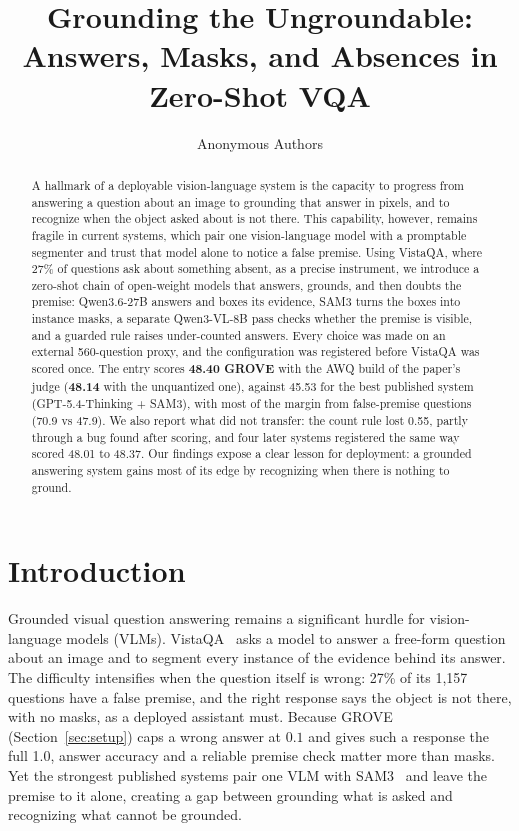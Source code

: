 \documentclass{article}
\title{Grounding the Ungroundable:\\ Answers, Masks, and Absences in Zero-Shot VQA}
\author{Anonymous Authors}
\begin{document}
\maketitle

\begin{abstract}
A hallmark of a deployable vision-language system is the capacity to progress from answering a question about an image to
grounding that answer in pixels, and to recognize when the object asked about is not there. This capability, however,
remains fragile in current systems, which pair one vision-language model with a promptable segmenter and trust that model
alone to notice a false premise. Using VistaQA, where 27\% of questions ask about something absent, as a precise instrument,
we introduce a zero-shot chain of open-weight models that answers, grounds, and then doubts the premise: Qwen3.6-27B answers
and boxes its evidence, SAM3 turns the boxes into instance masks, a separate Qwen3-VL-8B pass checks whether the premise is
visible, and a guarded rule raises under-counted answers. Every choice was made on an external 560-question proxy, and the
configuration was registered before VistaQA was scored once. The entry scores \textbf{48.40 GROVE} with the AWQ build of
the paper's judge (\textbf{48.14} with the unquantized one), against 45.53 for the best published system (GPT-5.4-Thinking +
SAM3), with most of the margin from false-premise questions (70.9 vs 47.9). We also report what did not transfer: the count rule lost
0.55, partly through a bug found after scoring, and four later systems registered the same way scored 48.01 to 48.37. Our
findings expose a clear lesson for deployment: a grounded answering system gains most of its edge by recognizing when
there is nothing to ground.
\end{abstract}

\section{Introduction}
Grounded visual question answering remains a significant hurdle for vision-language models (VLMs). VistaQA~\cite{vistaqa}
asks a model to answer a free-form question about an image and to segment every instance of the evidence behind its answer.
The difficulty intensifies when the question itself is wrong: 27\% of its 1,157 questions have a false premise, and the right
response says the object is not there, with no masks, as a deployed assistant must. Because GROVE (Section~\ref{sec:setup})
caps a wrong answer at $0.1$ and gives such a response the full 1.0, answer accuracy and a reliable premise check matter more
than masks. Yet the strongest published systems pair one VLM with SAM3~\cite{sam3} and leave the premise to it alone, creating a gap between grounding what is asked and recognizing what cannot be grounded.
\end{document}
